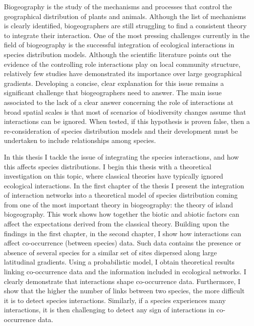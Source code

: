 Biogeography is the study of the mechanisms and processes that control
the geographical distribution of plants and animals. Although the list
of mechanisms is clearly identified, biogeographers are still struggling
to find a consistent theory to integrate their interaction. One of the
most pressing challenges currently in the field of biogeography is the
successful integration of ecological interactions in species
distribution models. Although the scientific literature points out the
evidence of the controlling role interactions play on local community
structure, relatively few studies have demonstrated its importance over
large geographical gradients. Developing a concise, clear explanation
for this issue remains a significant challenge that biogeographers need
to answer. The main issue associated to the lack of a clear answer
concerning the role of interactions at broad spatial scales is that most
of scenarios of biodiversity changes assume that interactions can be
ignored. When tested, if this hypothesis is proven false, then a
re-consideration of species distribution models and their development
must be undertaken to include relationships among species.

In this thesis I tackle the issue of integrating the species
interactions, and how this affects species distributions. I begin this
thesis with a theoretical investigation on this topic, where classical
theories have typically ignored ecological interactions. In the first
chapter of the thesis I present the integration of interaction networks
into a theoretical model of species distribution coming from one of the
most important theory in biogeography: the theory of island
biogeography. This work shows how together the biotic and abiotic
factors can affect the expectations derived from the classical theory.
Building upon the findings in the first chapter, in the second chapter,
I show how interactions can affect co-occurrence (between species) data.
Such data contains the presence or absence of several species for a
similar set of sites dispersed along large latitudinal gradients. Using
a probabilistic model, I obtain theoretical results linking
co-occurrence data and the information included in ecological networks.
I clearly demonstrate that interactions shape co-occurrence data.
Furthermore, I show that the higher the number of links between two
species, the more difficult it is to detect species interactions.
Similarly, if a species experiences many interactions, it is then
challenging to detect any sign of interactions in co-occurrence data.

